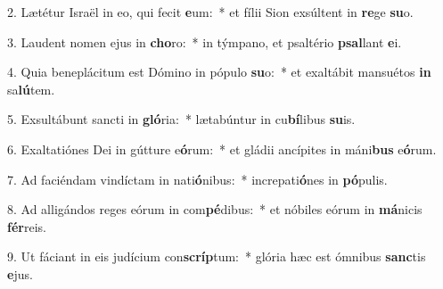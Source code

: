 2. Lætétur Israël in eo, qui fecit \textbf{e}um:~*  et fílii Sion exsúltent in \textbf{re}ge \textbf{su}o.\

3. Laudent nomen ejus in \textbf{cho}ro:~*  in týmpano, et psaltério \textbf{psal}lant \textbf{e}i.\

4. Quia beneplácitum est Dómino in pópulo \textbf{su}o:~*  et exaltábit mansuétos \textbf{in} sa\textbf{lú}tem.\

5. Exsultábunt sancti in \textbf{gló}ria:~*  lætabúntur in cu\textbf{bí}libus \textbf{su}is.\

6. Exaltatiónes Dei in gútture e\textbf{ó}rum:~*  et gládii ancípites in máni\textbf{bus} e\textbf{ó}rum.\

7. Ad faciéndam vindíctam in nati\textbf{ó}nibus:~*  increpati\textbf{ó}nes in \textbf{pó}pulis.\

8. Ad alligándos reges eórum in com\textbf{pé}dibus:~*  et nóbiles eórum in \textbf{má}nicis \textbf{fér}reis.\

9. Ut fáciant in eis judícium con\textbf{scríp}tum:~*  glória hæc est ómnibus \textbf{sanc}tis \textbf{e}jus.\


